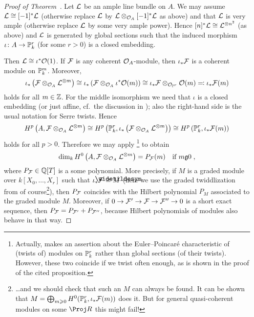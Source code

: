 \documentclass[a4paper,parskip=half,numbers=enddot, DIV=12]{scrreprt}
\renewcommand{\geq}{\geqslant}
\begin{document}
\begin{proof}[Proof of Theorem~]
	Let $\mathcal{L}$ be an ample line bundle on $A$. We may assume $\mathcal{L}\cong [-1]^*\mathcal{L}$ (otherwise replace $\mathcal{L}$ by $\mathcal{L}\otimes_{\mathcal{O}_A}[-1]^*\mathcal{L}$ as above) and that $\mathcal{L}$ is very ample (otherwise replace $\mathcal{L}$ by some very ample power). Hence $[n]^*\mathcal{L}\cong \mathcal{L}^{\otimes n^2}$ (as above) and $\mathcal{L}$ is generated by global sections such that the induced morphism $\iota\colon A\morphism\IP_k^r$ (for some $r>0$) is a closed embedding.
	
	Then $\mathcal{L}\cong \iota^*\mathcal{O}(1)$. If $\mathcal{F}$ is any coherent $\mathcal{O}_A$-module, then $\iota_*\mathcal{F}$ is a coherent module on $\mathbb{P}_k^m$. Moreover,
	\begin{align*}
		\iota_*\left(\mathcal{F}\otimes_{\mathcal{O}_A}\mathcal{L}^{\otimes m}\right)\cong \iota_*\left(\mathcal{F}\otimes_{\mathcal{O}_A}\iota^*\mathcal{O}(m)\right)\cong \iota_*\mathcal{F}\otimes_{\mathcal{O}_{\mathbb{P}^r}}\mathcal{O}(m) \eqqcolon\iota_*\mathcal{F}(m)
	\end{align*}
	holds for all $m\in \mathbb{Z}$. For the middle isomorphism we need that $\iota$ is a closed embedding (or just affine, cf.\ the discussion in \cite[Remark~2.2.7]{alggeo2}); also the right-hand side is the usual notation for Serre twists. Hence
	\begin{align*}
		H^p\left(A, \mathcal{F}\otimes_{\mathcal{O}_A}\mathcal{L}^{\otimes m}\right)\cong H^p\left(\mathbb{P}_k^r,\iota_*\left(\mathcal{F}\otimes_{\mathcal{O}_A}\mathcal{L}^{\otimes m}\right)\right)\cong H^p\left(\mathbb{P}_k^r,\iota_*\mathcal{F}(m)\right)
	\end{align*}
	holds for all $p>0$. Therefore we may apply \cite[Proposition~2.2.4]{alggeo2}\footnote{Actually, \cite[Proposition~2.2.4]{alggeo2} makes an assertion about the Euler--Poincaré characteristic of (twists of) modules on $\mathbb{P}_k^r$ rather than global sections (of their twists). However, these two coincide if we twist often enough, as is shown in the proof of the cited proposition.} to obtain
	\begin{align*}
		\dim_k H^0\left(A,\Ff\otimes_{\Oo_A}\Ll^{\otimes m}\right)=P_{\Ff}(m)\quad\text{if }m\gge 0\;,
	\end{align*}
	where $P_{\mathcal{F}}\in\mathbb{Q}[T]$ is a some polynomial. More precisely, if $M$ is a graded module over $k[X_0,\ldots,X_r]$ such that $\iota_*\Ff\cong \snake{M}$ (here we use the graded twiddlization from \cite[Remark~2.2.1]{alggeo2} of course\footnote{\ldots and we should check that such an $M$ can always be found. It can be shown that $M=\bigoplus_{m\geq 0}H^0(\IP_k^r,\iota_*\Ff(m))$ does it. But for general quasi-coherent modules on some $\Proj R$ this might fail!}), then $P_{\mathcal{F}}$ coincides with the Hilbert polynomial $P_M$ associated to the graded module $M$. Moreover, if $0\morphism\Ff'\morphism\Ff\morphism\Ff''\morphism 0$ is a short exact sequence, then $P_{\mathcal{F}}=P_{\mathcal{F}'}+P_{\mathcal{F}''}$, because Hilbert polynomials of modules also behave in that way.
	

\end{proof}
\end{document}
